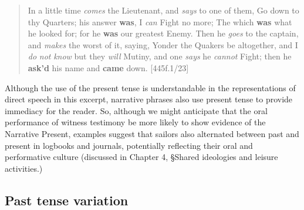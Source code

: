 \begin{quotation}
In a little time \textit{comes} the Lieutenant, and \textit{says} to one of them, Go down to thy Quarters; his answer \textbf{was}, I \textit{can} Fight no more; The which \textbf{was} what he looked for; for he \textbf{was} our greatest Enemy. Then he \textit{goes} to the captain, and \textit{makes} the worst of it, saying, Yonder the Quakers be altogether, and I \textit{do} \textit{not} \textit{know} but they \textit{will} Mutiny, and one \textit{says} he \textit{cannot} Fight; then he \textbf{ask’d} his name and \textbf{came} down. [445f.1/23]\end{quotation}

Although the use of the present tense is understandable in the representations of direct speech in this excerpt, narrative phrases also use present tense to provide immediacy for the reader. So, although we might anticipate that the oral performance of witness testimony be more likely to show evidence of the Narrative Present, examples suggest that sailors also alternated between past and present in logbooks and journals, potentially reflecting their oral and performative culture (discussed in Chapter 4, §Shared ideologies and leisure activities.) 

\subsection{\textbf{Past} \textbf{tense} \textbf{variation} }%

